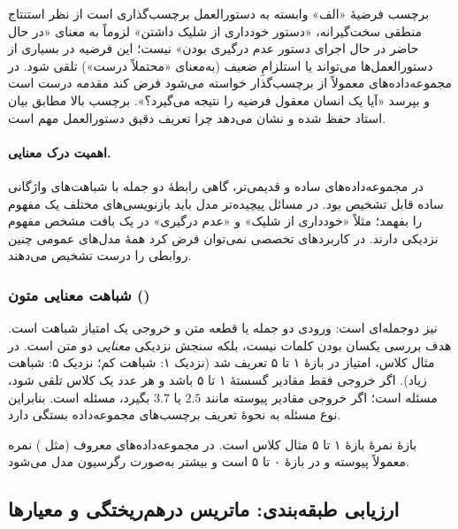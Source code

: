 \begin{correctionbox}{برچسب فرضیهٔ «الف» وابسته به دستورالعمل برچسب‌گذاری است}
از نظر استنتاج منطقی سخت‌گیرانه، «دستور خودداری از شلیک داشتن» لزوماً به معنای «در حال حاضر در حال اجرای دستور عدم درگیری بودن» نیست؛ این فرضیه در بسیاری از دستورالعمل‌ها می‌تواند  یا استلزامِ ضعیف (به‌معنای «محتملاً درست») تلقی شود. در مجموعه‌داده‌های  معمولاً از برچسب‌گذار خواسته می‌شود فرض کند مقدمه درست است و بپرسد «آیا یک انسان معقول فرضیه را نتیجه می‌گیرد؟». برچسب بالا مطابق بیان استاد حفظ شده و نشان می‌دهد چرا تعریف دقیق دستورالعمل مهم است.
\end{correctionbox}

\paragraph{اهمیت درک معنایی.} در مجموعه‌داده‌های ساده و قدیمی‌تر، گاهی رابطهٔ دو جمله با شباهت‌های واژگانی ساده قابل تشخیص بود. در مسائل پیچیده‌تر مدل باید بازنویسی‌های مختلف یک مفهوم را بفهمد؛ مثلاً «خودداری از شلیک» و «عدم درگیری» در یک بافت مشخص مفهوم نزدیکی دارند. در کاربردهای تخصصی نمی‌توان فرض کرد همهٔ مدل‌های عمومی چنین روابطی را درست تشخیص می‌دهند.

\subsubsection{شباهت معنایی متون ()}
 نیز دوجمله‌ای است: ورودی دو جمله یا قطعه متن و خروجی یک امتیاز شباهت است. هدف بررسی یکسان بودن کلمات نیست، بلکه سنجش نزدیکی \emph{معنایی} دو متن است. در مثال کلاس، امتیاز در بازهٔ ۱ تا ۵ تعریف شد (نزدیک ۱: شباهت کم؛ نزدیک ۵: شباهت زیاد). اگر خروجی فقط مقادیر گسستهٔ ۱ تا ۵ باشد و هر عدد یک کلاس تلقی شود، مسئله  است؛ اگر خروجی مقادیر پیوسته مانند $2.5$ یا $3.7$ بگیرد، مسئله  است. بنابراین نوع مسئله به نحوهٔ تعریف برچسب‌های مجموعه‌داده بستگی دارد.

\begin{correctionbox}{بازهٔ نمرهٔ }
بازهٔ ۱ تا ۵ مثال کلاس است. در مجموعه‌داده‌های معروف  (مثل ) نمره معمولاً پیوسته و در بازهٔ ۰ تا ۵ است و بیشتر به‌صورت رگرسیون مدل می‌شود.
\end{correctionbox}

\subsection{ارزیابی طبقه‌بندی: ماتریس درهم‌ریختگی و معیارها}
